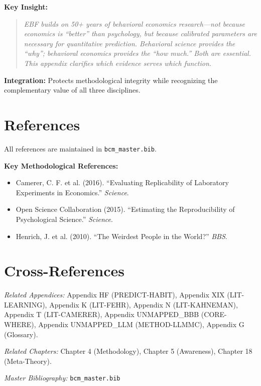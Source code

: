 \documentclass[11pt, a4paper]{article}
\begin{document}
\begin{tcolorbox}[colback=green!10!white, colframe=green!75!black,
    title=\textbf{Appendix XX: Summary}]
\textbf{Key Insight:}
\begin{quote}
\textit{EBF builds on 50+ years of behavioral economics research---not because economics is ``better'' than psychology, but because calibrated parameters are necessary for quantitative prediction. Behavioral science provides the ``why''; behavioral economics provides the ``how much.'' Both are essential. This appendix clarifies which evidence serves which function.}
\end{quote}

\textbf{Integration:} Protects methodological integrity while recognizing the complementary value of all three disciplines.

\end{tcolorbox}


\section{References}
\label{sec:evd-references}

All references are maintained in \texttt{bcm\_master.bib}.

\textbf{Key Methodological References:}
\begin{itemize}[nosep]
    \item Camerer, C. F. et al. (2016). ``Evaluating Replicability of Laboratory Experiments in Economics.'' \textit{Science}.
    \item Open Science Collaboration (2015). ``Estimating the Reproducibility of Psychological Science.'' \textit{Science}.
    \item Henrich, J. et al. (2010). ``The Weirdest People in the World?'' \textit{BBS}.
\end{itemize}


\section{Cross-References}
\label{sec:evd-crossref}

\noindent\textit{Related Appendices:}
Appendix HF (PREDICT-HABIT),
Appendix XIX (LIT-LEARNING),
Appendix K (LIT-FEHR),
Appendix N (LIT-KAHNEMAN),
Appendix T (LIT-CAMERER),
Appendix UNMAPPED_BBB (CORE-WHERE),
Appendix UNMAPPED_LLM (METHOD-LLMMC),
Appendix G (Glossary).

\noindent\textit{Related Chapters:}
Chapter 4 (Methodology),
Chapter 5 (Awareness),
Chapter 18 (Meta-Theory).

\noindent\textit{Master Bibliography:} \texttt{bcm\_master.bib}

\nocite{bcm_master}

\end{document}
